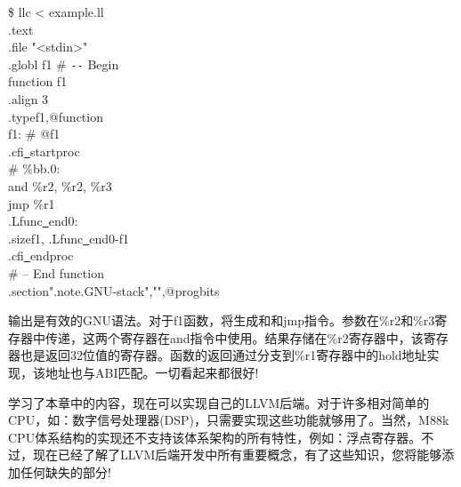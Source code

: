 \begin{tcolorbox}[colback=white,colframe=black]
\$ llc < example.ll \\
\hspace*{1cm}.text \\
\hspace*{1cm}.file \hspace{0.8cm}"<stdin>" \\
\hspace*{1cm}.globl \hspace{0.5cm}f1 \hspace{6cm} \# \verb|--| Begin \\
function f1 \\
\hspace*{1cm}.align \hspace{0.5cm} 3 \\
\hspace*{1cm}.type\hspace{0.8cm}f1,@function \\
f1: \hspace{8cm} \# @f1 \\
\hspace*{1cm}.cfi\underline{~}startproc \\
\# \%bb.0: \\
\hspace*{1cm}and \%r2, \%r2, \%r3 \\
\hspace*{1cm}jmp \%r1 \\
.Lfunc\underline{~}end0: \\
\hspace*{1cm}.size\hspace{1cm}f1, .Lfunc\underline{~}end0-f1 \\
\hspace*{1cm}.cfi\underline{~}endproc \\
\hspace*{8.8cm}\# -- End function \\
\hspace*{1cm}.section\hspace{1cm}".note.GNU-stack","",@progbits
\end{tcolorbox}

输出是有效的GNU语法。对于f1函数，将生成和和jmp指令。参数在\%r2和\%r3寄存器中传递，这两个寄存器在and指令中使用。结果存储在\%r2寄存器中，该寄存器也是返回32位值的寄存器。函数的返回通过分支到\%r1寄存器中的hold地址实现，该地址也与ABI匹配。一切看起来都很好!\par

学习了本章中的内容，现在可以实现自己的LLVM后端。对于许多相对简单的CPU，如：数字信号处理器(DSP)，只需要实现这些功能就够用了。当然，M88k CPU体系结构的实现还不支持该体系架构的所有特性，例如：浮点寄存器。不过，现在已经了解了LLVM后端开发中所有重要概念，有了这些知识，您将能够添加任何缺失的部分!\par















